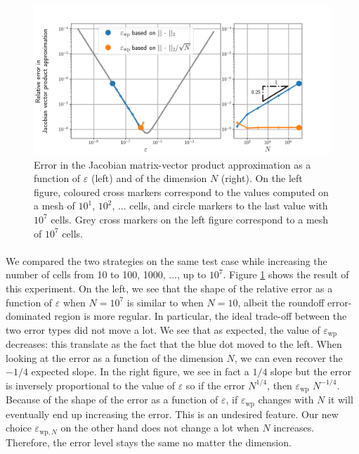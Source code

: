       \begin{figure}
        \centering
        \includegraphics[width=\textwidth]{figures/epsilon_Burgers.png}
        \caption{
          Error in the Jacobian matrix-vector product approximation as a function of $\varepsilon$ (left) and of the dimension $N$ (right).
          On the left figure, coloured cross markers correspond to the values computed on a mesh of $10^1$, $10^2$, ... cells, and circle markers to the last value with $10^7$ cells.
          Grey cross markers on the left figure correspond to a mesh of $10^7$ cells.
        }
        \label{fig:epsilon_burgers}
      \end{figure}

      \paragraph{}
      We compared the two strategies on the same test case while increasing the number of cells from 10 to 100, 1000, ..., up to $10^7$.
      Figure \ref{fig:epsilon_burgers} shows the result of this experiment.
      On the left, we see that the shape of the relative error as a function of $\varepsilon$ when $N = 10^7$ is similar to when $N = 10$, albeit the roundoff error-dominated region is more regular.
      In particular, the ideal trade-off between the two error types did not move a lot.
      We see that as expected, the value of $\varepsilon_\textrm{wp}$ decreases: this translate as the fact that the blue dot moved to the left.
      When looking at the error as a function of the dimension $N$, we can even recover the $-1/4$ expected slope.
      In the right figure, we see in fact a $1/4$ slope but the error is inversely proportional to the value of $\varepsilon$ so if the error  $N^{1/4}$, then $\varepsilon_\textrm{wp}$  $N^{-1/4}$.
      Because of the shape of the error as a function of $\varepsilon$, if $\varepsilon_\textrm{wp}$ changes with $N$ it will eventually end up increasing the error.
      This is an undesired feature.
      Our new choice $\varepsilon_{\textrm{wp}, N}$ on the other hand does not change a lot when $N$ increases.
      Therefore, the error level stays the same no matter the dimension.


